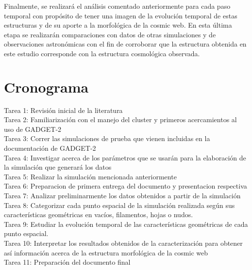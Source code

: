 \documentclass{article}
\begin{document}
Finalmente, se realizará el análisis comentado anteriormente para cada
paso temporal con propósito de tener una imagen de la evolución
temporal de estas estructuras y de su aporte a la morfológica de la
cosmic web. En esta última etapa se realizarán comparaciones con datos
de otras simulaciones y de observaciones astronómicas con el fin de
corroborar que la estructura obtenida en este estudio corresponde con
la estructura cosmológica observada.          



\section{Cronograma}

Tarea 1: Revisión inicial de la literatura \\ 
Tarea 2: Familiarización con el manejo del cluster y primeros
acercamientos al uso de GADGET-2 \\ 
Tarea 3: Correr las simulaciones de prueba que vienen incluidas en la
documentación de GADGET-2  \\ 
Tarea 4: Investigar acerca de los parámetros que se usarán para la elaboración de la simulación que generará los datos \\
Tarea 5: Realizar la simulación mencionada anteriormente \\
Tarea 6: Preparacion de primera entrega del documento y presentacion respectiva \\
Tarea 7: Analizar preliminarmente los datos obtenidos a partir de la
simulación \\ 
Tarea 8: Categorizar cada punto espacial de la simulación realizada
según sus características geométricas en vacíos, filamentos, hojas o
nudos.\\
Tarea 9: Estudiar la evolución temporal de las características
geométricas de cada punto espacial. \\ 
Tarea 10: Interpretar los resultados obtenidos de la caracterización para obtener así información acerca de la estructura morfológica de la cosmic web \\
Tarea 11: Preparación del documento final \\
\end{document}
